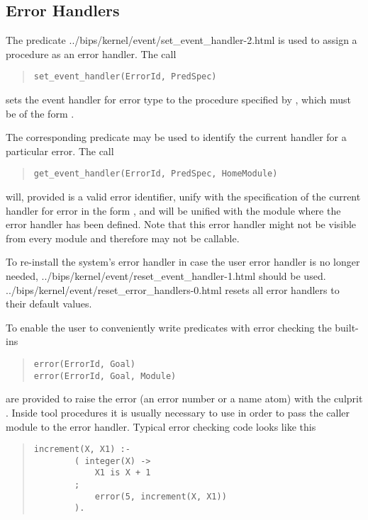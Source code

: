\subsection{Error Handlers}
The predicate %
{../bips/kernel/event/set_event_handler-2.html} is used to assign a procedure as
an error handler. The call
\begin{quote}
\begin{verbatim}
set_event_handler(ErrorId, PredSpec)
\end{verbatim}
\end{quote}
sets the event handler for error type  to the procedure specified
by , which must be of the form .

The corresponding predicate
may be used to identify
the current handler for a particular error. The call
\begin{quote}
\begin{verbatim}
get_event_handler(ErrorId, PredSpec, HomeModule)
\end{verbatim}
\end{quote}
will, provided  is a valid error identifier, unify
with the
specification of the current handler for error  in the form
, and  will be unified with the module
where the
error handler has been defined. Note that this error handler might not be
visible from every module and therefore may not be callable.

To re-install the system's error handler in case the user error handler is
no longer needed,
%
{../bips/kernel/event/reset_event_handler-1.html}
should be used.
%
{../bips/kernel/event/reset_error_handlers-0.html} resets all error handlers to
their default values.

To enable the user to conveniently write predicates with error checking
the built-ins
\begin{quote}
\begin{verbatim}
error(ErrorId, Goal)
error(ErrorId, Goal, Module)
\end{verbatim}
\end{quote}
are provided to raise the error  (an error number or a name atom)
with the culprit .
Inside tool procedures it is usually necessary to use
in order to pass the caller module to the error handler.
Typical error checking code looks like this
\begin{quote}
\begin{verbatim}
increment(X, X1) :-
        ( integer(X) ->
            X1 is X + 1
        ;
            error(5, increment(X, X1))
        ).
\end{verbatim}
\end{quote}

